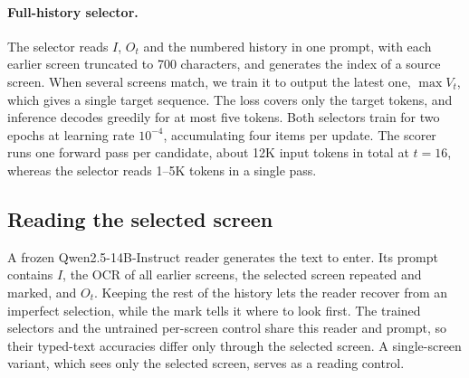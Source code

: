 \documentclass{article}
\begin{document}
\paragraph{Full-history selector.} The selector reads $I$, $O_t$ and the numbered history in one prompt, with each earlier screen truncated to 700 characters, and generates the index of a source screen. When several screens match, we train it to output the latest one, $\max V_t$, which gives a single target sequence. The loss covers only the target tokens, and inference decodes greedily for at most five tokens. Both selectors train for two epochs at learning rate $10^{-4}$, accumulating four items per update. The scorer runs one forward pass per candidate, about 12K input tokens in total at $t=16$, whereas the selector reads 1--5K tokens in a single pass.

\subsection{Reading the selected screen}
A frozen Qwen2.5-14B-Instruct reader generates the text to enter. Its prompt contains $I$, the OCR of all earlier screens, the selected screen repeated and marked, and $O_t$. Keeping the rest of the history lets the reader recover from an imperfect selection, while the mark tells it where to look first. The trained selectors and the untrained per-screen control share this reader and prompt, so their typed-text accuracies differ only through the selected screen. A single-screen variant, which sees only the selected screen, serves as a reading control.



\end{document}
